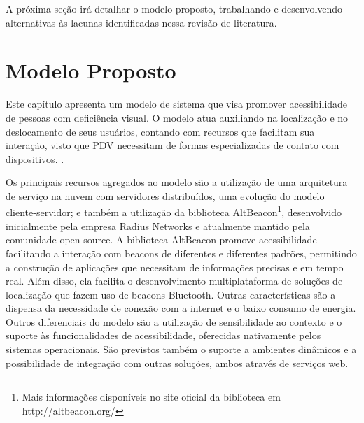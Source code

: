 \documentclass[twoside,english,brazilian]{UNISINOSartigo}
\begin{document}
A próxima seção irá detalhar o modelo proposto, trabalhando e desenvolvendo alternativas às lacunas identificadas nessa revisão de literatura.


















\section{Modelo Proposto}
Este capítulo apresenta um modelo de sistema que visa promover acessibilidade de pessoas com deficiência visual. O modelo atua auxiliando na localização e no deslocamento de seus usuários, contando com recursos que facilitam sua interação, visto que PDV necessitam de formas especializadas de contato com dispositivos. .

Os principais recursos agregados ao modelo são a utilização de uma arquitetura de serviço na nuvem com servidores distribuídos, uma evolução do modelo cliente-servidor; e também a utilização da biblioteca AltBeacon\footnote{Mais informações disponíveis no site oficial da biblioteca em http://altbeacon.org/}, desenvolvido inicialmente pela empresa Radius Networks e atualmente mantido pela comunidade open source. A biblioteca AltBeacon promove acessibilidade facilitando a interação com beacons de diferentes e diferentes padrões, permitindo a construção de aplicações que necessitam de informações precisas e em tempo real. Além disso, ela facilita o desenvolvimento multiplataforma de soluções de localização que fazem uso de beacons Bluetooth. Outras características são a dispensa da necessidade de conexão com a internet e o baixo consumo de energia. Outros diferenciais do modelo são a utilização de sensibilidade ao contexto e o suporte às funcionalidades de acessibilidade, oferecidas nativamente pelos sistemas operacionais.
São previstos também o suporte a ambientes dinâmicos e a possibilidade de integração com outras soluções, ambos através de serviços web.
\end{document}
